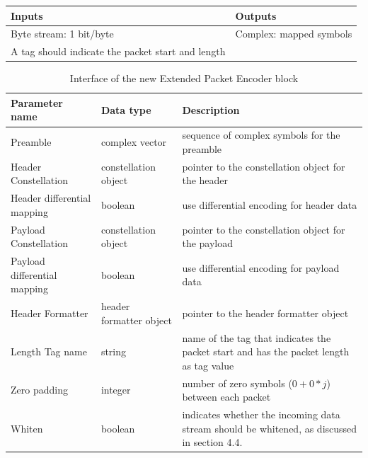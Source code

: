 \begin{table}[H]
  \begin{center}
  \begin{tabular}{|l|l|}

    \hline
    Inputs & Outputs\\
    \hline
    \hline
    Byte stream: 1 bit/byte & Complex: mapped symbols  \\
    A tag should indicate the packet start and length & \\
    \hline

  \end{tabular}
  \end{center}
  \end{table}
   \vspace*{-0.5cm}
  \begin{table}[H]
  \begin{center}
  \begin{tabular}{|l|l|p{6cm}|}
    \hline
    Parameter name & Data type & Description\\
    \hline
    \hline
    Preamble & complex vector & sequence of complex symbols for the preamble\\
    \hline
    Header Constellation & constellation object & pointer to the constellation object for the header\\
    \hline
    Header differential mapping & boolean & use differential encoding for header data\\
     \hline
    Payload Constellation & constellation object & pointer to the constellation object for the payload\\
    \hline
    Payload differential mapping & boolean & use differential encoding for payload data\\
     \hline
    Header Formatter & header formatter object & pointer to the header formatter object\\
     \hline
    Length Tag name & string & name of the tag that indicates the packet start and has the packet length as tag value\\
     \hline
    Zero padding & integer & number of zero symbols (\(0 + 0*j\))  between each packet\\
     \hline
    Whiten & boolean & indicates whether the incoming data stream should be whitened, as discussed in section 4.4.\\
    \hline
  \end{tabular}
  \caption{Interface of the new Extended Packet Encoder block}
  \label{enc_interface}
  \end{center}
\end{table}
 \vspace*{-0.7cm}

